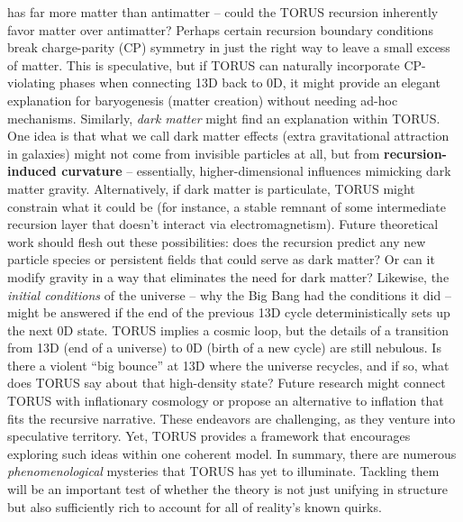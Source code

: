 \documentclass[
]{article}
\begin{document}
{\begin{itemize}
  has far more matter than antimatter -- could the TORUS recursion
  inherently favor matter over antimatter? Perhaps certain recursion
  boundary conditions break charge-parity (CP) symmetry in just the
  right way to leave a small excess of matter\hspace{0pt}. This is
  speculative, but if TORUS can naturally incorporate CP-violating
  phases when connecting 13D back to 0D, it might provide an elegant
  explanation for baryogenesis (matter creation) without needing ad-hoc
  mechanisms. Similarly, \emph{dark matter} might find an explanation
  within TORUS. One idea is that what we call dark matter effects (extra
  gravitational attraction in galaxies) might not come from invisible
  particles at all, but from \textbf{recursion-induced curvature} --
  essentially, higher-dimensional influences mimicking dark matter
  gravity\hspace{0pt}. Alternatively, if dark matter is particulate,
  TORUS might constrain what it could be (for instance, a stable remnant
  of some intermediate recursion layer that doesn't interact via
  electromagnetism\hspace{0pt}). Future theoretical work should flesh
  out these possibilities: does the recursion predict any new particle
  species or persistent fields that could serve as dark matter? Or can
  it modify gravity in a way that eliminates the need for dark matter?
  Likewise, the \emph{initial conditions} of the universe -- why the Big
  Bang had the conditions it did -- might be answered if the end of the
  previous 13D cycle deterministically sets up the next 0D state. TORUS
  implies a cosmic loop, but the details of a transition from 13D (end
  of a universe) to 0D (birth of a new cycle) are still nebulous. Is
  there a violent ``big bounce'' at 13D where the universe recycles, and
  if so, what does TORUS say about that high-density state? Future
  research might connect TORUS with inflationary cosmology or propose an
  alternative to inflation that fits the recursive narrative. These
  endeavors are challenging, as they venture into speculative territory.
  Yet, TORUS provides a framework that encourages exploring such ideas
  within one coherent model. In summary, there are numerous
  \emph{phenomenological} mysteries that TORUS has yet to illuminate.
  Tackling them will be an important test of whether the theory is not
  just unifying in structure but also sufficiently rich to account for
  all of reality's known quirks.
\end{itemize}

}
\end{document}
